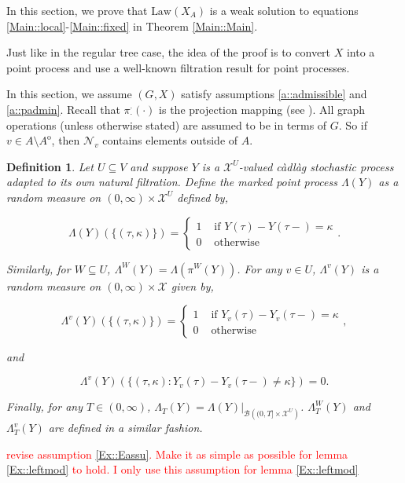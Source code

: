 \documentclass[12pt]{article}
\newcommand{\mc}{\mathcal}
\newcommand{\ms}{\mathscr}
\newcommand{\te}{\text}
\newcommand{\tr}{\textcolor{red}}
\newcommand{\ind}{\hspace{24pt}}
\newcommand{\sta}{\mc{X}}							%
\newcommand{\neigh}[1]{\mc{N}_{#1}}				%
\newcommand{\Xf}{X}									%
\newcommand{\proj}{\pi}								%
\newcommand{\vind}[1]{_{#1}}						%
\newcommand{\tme}[1]{(#1)}							%
\newcommand{\vpara}[1]{^{#1}}						%
\newcommand{\tpara}[1]{_{#1}}						%
\newcommand{\Xg}{Y}									%
\newcommand{\inte}[1]{{#1}^\mathrm{o}}				%
\newcommand{\pmap}{\Lambda}							%
\newcommand{\rt}{\tau}								%
\renewcommand{\mark}{\kappa}						%
\newcommand{\law}{\te{Law}}							%
\newtheorem{defn}[thms]{Definition}
\begin{document}
In this section, we prove that \(\law(\Xf\vind{A})\) is a weak solution to equations \eqref{Main::local}-\eqref{Main::fixed} in Theorem \ref{Main::Main}.

\ind Just like in the regular tree case, the idea of the proof is to convert \(\Xf\) into a point process and use a well-known filtration result for point processes.

\ind In this section, we assume \((G,\Xf)\) satisfy assumptions \ref{a::admissible} and \ref{a::padmin}. Recall that \(\proj\vpara{\cdot}\tpara{\cdot}(\cdot)\) is the projection mapping (see \cite[section \ref{F-not::p}]{F}). All graph operations (unless otherwise stated) are assumed to be in terms of \(G\). So if \(v \in A\setminus\inte{A}\), then \(\neigh{v}\) contains elements outside of \(A\).

\begin{defn}
Let \(U\subseteq V\) and suppose \(\Xg\) is a \(\sta^U\)-valued c\`adl\`ag stochastic process adapted to its own natural filtration. Define the marked point process \(\pmap(\Xg)\) as a random measure on \((0,\infty) \times \sta^U\) defined by,

\[\pmap(\Xg)(\{(\rt,\mark)\}) = \begin{cases}
1 &\te{ if } \Xg\tme{\rt} - \Xg\tme{\rt-} = \mark\\
0 &\te{ otherwise}
\end{cases}.\]

Similarly, for \(W \subseteq U\), \(\pmap\vpara{W}(\Xg) = \pmap\left(\proj\vpara{W}(\Xg)\right)\). For any \(v\in U\), \(\pmap\vpara{v}(\Xg)\) is a random measure on \((0,\infty) \times \sta\) given by,

\[\pmap\vpara{v}(\Xg)(\{(\rt,\mark)\}) = \begin{cases}
1 &\te{ if } \Xg\vind{v}\tme{\rt} - \Xg\vind{v}\tme{\rt-} = \mark\\
0 &\te{ otherwise}
\end{cases},\]

and

\[\pmap\vpara{v}(\Xg)(\{(\rt,\mark): \Xg\vind{v}\tme{\rt} - \Xg\vind{v}\tme{\rt-} \neq \mark\}) = 0.\]

Finally, for any \(T\in (0,\infty)\), \(\pmap\tpara{T}(\Xg) = \pmap(\Xg)|_{\ms{B}\left((0,T]\times\sta^U\right)}\). \(\pmap\vpara{W}\tpara{T}(\Xg)\) and \(\pmap\vpara{v}\tpara{T}(\Xg)\) are defined in a similar fashion.
\label{Ex::pmap}
\end{defn}

\ind \tr{revise assumption \ref{Ex::Eassu}. Make it as simple as possible for lemma \ref{Ex::leftmod} to hold. I only use this assumption for lemma \ref{Ex::leftmod}}
\end{document}
